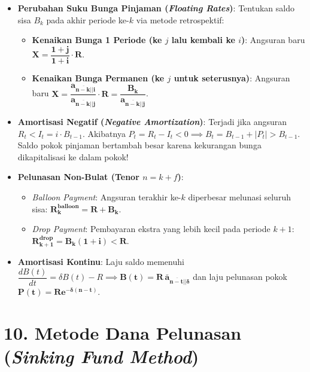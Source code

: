 \documentclass[10pt,a4paper]{article}
\newcommand{\angl}[1]{\overline{#1|}}
\begin{document}
\begin{jebakanbox}
\begin{itemize}[leftmargin=1.5em, topsep=1.5pt, itemsep=2pt]
    \item \textbf{Perubahan Suku Bunga Pinjaman (\textit{Floating Rates})}:
    Tentukan saldo sisa $B_k$ pada akhir periode ke-$k$ via metode retrospektif:
    \begin{itemize}[leftmargin=1.2em, topsep=1pt]
        \item \textbf{Kenaikan Bunga 1 Periode (ke $j$ lalu kembali ke $i$)}: Angsuran baru $\mathbf{X = \dfrac{1+j}{1+i} \cdot R}$.
        \item \textbf{Kenaikan Bunga Permanen (ke $j$ untuk seterusnya)}: Angsuran baru $\mathbf{X = \dfrac{a_{\angl{n-k}|i}}{a_{\angl{n-k}|j}} \cdot R = \dfrac{B_k}{a_{\angl{n-k}|j}}}$.
    \end{itemize}
    \item \textbf{Amortisasi Negatif (\textit{Negative Amortization})}: Terjadi jika angsuran $R_t < I_t = i \cdot B_{t-1}$.
    Akibatnya $P_t = R_t - I_t < 0 \implies B_t = B_{t-1} + |P_t| > B_{t-1}$. Saldo pokok pinjaman bertambah besar karena kekurangan bunga dikapitalisasi ke dalam pokok!
    \item \textbf{Pelunasan Non-Bulat (Tenor $n = k + f$)}:
    \begin{itemize}[leftmargin=1.2em, topsep=1pt]
        \item \textit{Balloon Payment}: Angsuran terakhir ke-$k$ diperbesar melunasi seluruh sisa: $\mathbf{R_k^{\text{balloon}} = R + B_k}$.
        \item \textit{Drop Payment}: Pembayaran ekstra yang lebih kecil pada periode $k+1$: $\mathbf{R_{k+1}^{\text{drop}} = B_k(1+i) < R}$.
    \end{itemize}
    \item \textbf{Amortisasi Kontinu}: Laju saldo memenuhi $\dfrac{dB(t)}{dt} = \delta B(t) - R \implies \mathbf{B(t) = R \, \bar{a}_{\angl{n-t}|\delta}}$ dan laju pelunasan pokok $\mathbf{P(t) = R e^{-\delta(n-t)}}$.
\end{itemize}
\end{jebakanbox}

\section*{\large 10. Metode Dana Pelunasan (\textit{Sinking Fund Method})}
\end{document}
